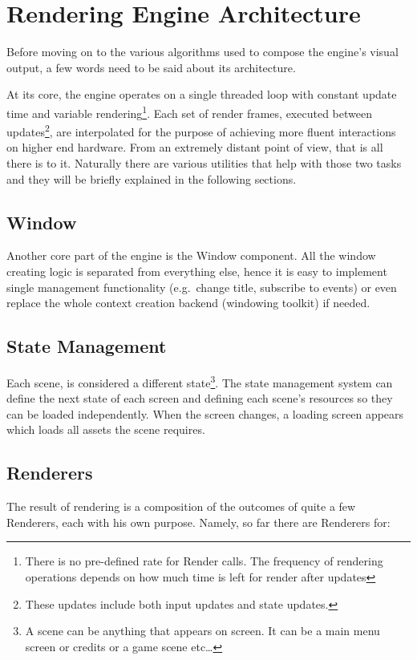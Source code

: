 \section{Rendering Engine Architecture}
Before moving on to the various algorithms used to compose the engine's visual output, a few
words need to be said about its architecture.

At its core, the engine operates on a single threaded loop with constant update time and
variable rendering\footnote{There is no pre-defined rate for Render calls. The frequency of
rendering operations depends on how much time is left for render after updates}.
Each set of render frames, executed between updates\footnote{These updates include both input
updates and state updates.}, are interpolated for the purpose of achieving more fluent interactions
on higher end hardware. From an extremely distant point of view, that is all there is to it.
Naturally there are various utilities that help with those two tasks and they will be briefly
explained in the following sections.

\subsection{Window}
Another core part of the engine is the Window component. All the window creating logic
is separated from everything else, hence it is easy to implement single management functionality
(e.g.\ change title, subscribe to events) or even replace the whole context creation backend
(windowing toolkit) if needed.

\subsection{State Management}
Each scene, is considered a different state\footnote{A scene can be anything that appears on
screen. It can be a main menu screen or credits or a game scene etc\dots}. The state management
system can define the next state of each screen and defining each scene's resources
so they can be loaded independently. When the screen changes, a loading screen appears which loads
all assets the scene requires.

\subsection{Renderers}
The result of rendering is a composition of the outcomes of quite a few Renderers, each
with his own purpose. Namely, so far there are Renderers for:

